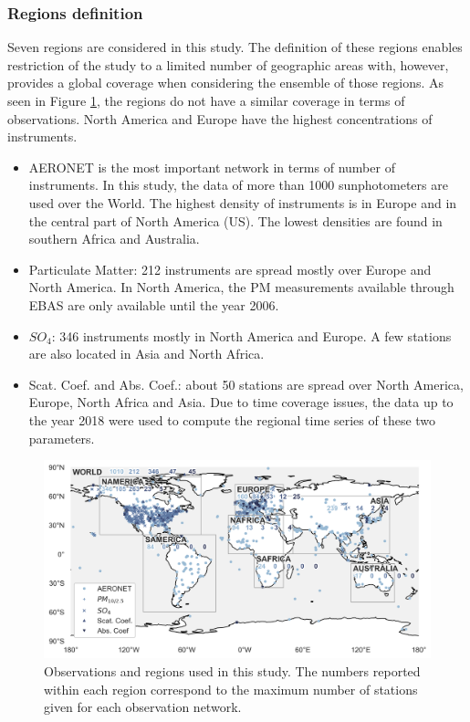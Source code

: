 \documentclass[journal abbreviation, manuscript]{copernicus}
\begin{document}
\subsubsection{Regions definition}
Seven regions are considered in this study. The definition of these regions enables restriction of the study to a limited number of geographic areas with, however, provides a global coverage when considering the ensemble of those regions. As seen in Figure \ref{fig:map_obs}, the regions do not have a similar coverage in terms of observations. North America and Europe have the highest concentrations of instruments.
\begin{itemize}
 \item AERONET is the most important network in terms of number of instruments. In this study, the data of more than 1000 sunphotometers are used over the World. The highest density of instruments is in Europe and in the central part of North America (US). The lowest densities are found in southern Africa and Australia.
 \item Particulate Matter: 212 instruments are spread mostly over Europe and North America. In North America, the PM measurements available through EBAS are only available until the year 2006.
 \item $SO_{4}$: 346 instruments mostly in North America and Europe. A few stations are also located in Asia and North Africa.
 \item Scat. Coef. and Abs. Coef.: about 50 stations are spread over North America, Europe, North Africa and Asia. Due to time coverage issues, the data up to the year 2018 were used to compute the regional time series of these two parameters.
\end{itemize}

\begin{figure}
 \includegraphics[width=12cm]{../scripts/figs/maps/av_obs.png}
 \caption{Observations and regions used in this study. The numbers reported within each region correspond to the maximum number of stations given for each observation network.}
 \label{fig:map_obs}
\end{figure}
\end{document}
